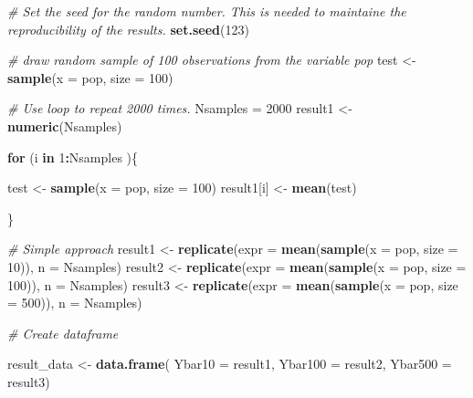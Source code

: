 \documentclass[]{book}
\newenvironment{Shaded}{\begin{snugshade}}{\end{snugshade}}
\newcommand{\CommentTok}[1]{\textcolor[rgb]{0.56,0.35,0.01}{\textit{#1}}}
\newcommand{\ControlFlowTok}[1]{\textcolor[rgb]{0.13,0.29,0.53}{\textbf{#1}}}
\newcommand{\DataTypeTok}[1]{\textcolor[rgb]{0.13,0.29,0.53}{#1}}
\newcommand{\DecValTok}[1]{\textcolor[rgb]{0.00,0.00,0.81}{#1}}
\newcommand{\KeywordTok}[1]{\textcolor[rgb]{0.13,0.29,0.53}{\textbf{#1}}}
\newcommand{\NormalTok}[1]{#1}
\newcommand{\OperatorTok}[1]{\textcolor[rgb]{0.81,0.36,0.00}{\textbf{#1}}}
\newcommand{\StringTok}[1]{\textcolor[rgb]{0.31,0.60,0.02}{#1}}
\begin{document}
\begin{Shaded}
\begin{Highlighting}[]
\CommentTok{# Set the seed for the random number. This is needed to maintaine the reproducibility of the results.}
\KeywordTok{set.seed}\NormalTok{(}\DecValTok{123}\NormalTok{)}

\CommentTok{# draw random sample of 100 observations from the variable pop}
\NormalTok{test <-}\StringTok{ }\KeywordTok{sample}\NormalTok{(}\DataTypeTok{x =}\NormalTok{ pop, }\DataTypeTok{size =} \DecValTok{100}\NormalTok{)}

\CommentTok{# Use loop to repeat 2000 times. }
\NormalTok{Nsamples =}\StringTok{ }\DecValTok{2000}
\NormalTok{result1 <-}\StringTok{ }\KeywordTok{numeric}\NormalTok{(Nsamples)}

\ControlFlowTok{for}\NormalTok{ (i }\ControlFlowTok{in} \DecValTok{1}\OperatorTok{:}\NormalTok{Nsamples )\{}
  
\NormalTok{  test <-}\StringTok{ }\KeywordTok{sample}\NormalTok{(}\DataTypeTok{x =}\NormalTok{ pop, }\DataTypeTok{size =} \DecValTok{100}\NormalTok{)}
\NormalTok{  result1[i] <-}\StringTok{ }\KeywordTok{mean}\NormalTok{(test)}
  
\NormalTok{\}}

\CommentTok{# Simple approach}
\NormalTok{result1 <-}\StringTok{ }\KeywordTok{replicate}\NormalTok{(}\DataTypeTok{expr =} \KeywordTok{mean}\NormalTok{(}\KeywordTok{sample}\NormalTok{(}\DataTypeTok{x =}\NormalTok{ pop, }\DataTypeTok{size =} \DecValTok{10}\NormalTok{)), }\DataTypeTok{n =}\NormalTok{ Nsamples)}
\NormalTok{result2 <-}\StringTok{ }\KeywordTok{replicate}\NormalTok{(}\DataTypeTok{expr =} \KeywordTok{mean}\NormalTok{(}\KeywordTok{sample}\NormalTok{(}\DataTypeTok{x =}\NormalTok{ pop, }\DataTypeTok{size =} \DecValTok{100}\NormalTok{)), }\DataTypeTok{n =}\NormalTok{ Nsamples)}
\NormalTok{result3 <-}\StringTok{ }\KeywordTok{replicate}\NormalTok{(}\DataTypeTok{expr =} \KeywordTok{mean}\NormalTok{(}\KeywordTok{sample}\NormalTok{(}\DataTypeTok{x =}\NormalTok{ pop, }\DataTypeTok{size =} \DecValTok{500}\NormalTok{)), }\DataTypeTok{n =}\NormalTok{ Nsamples)}

\CommentTok{# Create dataframe}

\NormalTok{result_data <-}\StringTok{ }\KeywordTok{data.frame}\NormalTok{(  }\DataTypeTok{Ybar10 =}\NormalTok{ result1, }
                            \DataTypeTok{Ybar100 =}\NormalTok{ result2, }
                            \DataTypeTok{Ybar500 =}\NormalTok{ result3)}
\end{Highlighting}
\end{Shaded}
\end{document}
